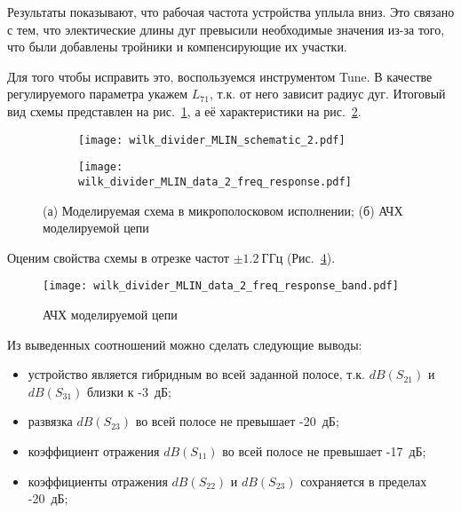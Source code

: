 Результаты показывают, что рабочая частота устройства уплыла вниз.
Это связано с тем, что электические длины дуг превысили необходимые значения из-за того, что были добавлены тройники и компенсирующие их участки.

Для того чтобы исправить это, воспользуемся инструментом Tune.
В качестве регулируемого параметра укажем $L_{71}$, т.к. от него зависит радиус дуг.
Итоговый вид схемы представлен на рис.~\ref{fig:wilk_divider_MLIN_schematic_2}, а её характеристики на рис.~\ref{fig:wilk_divider_MLIN_data_2_freq_response}.

\begin{figure}[!ht]
    \begin{subfigure}[!ht]{0.45\textwidth}
        \centering
        \texttt{[image: wilk\_divider\_MLIN\_schematic\_2.pdf]}
        \caption{}%
        \label{fig:wilk_divider_MLIN_schematic_2}
    \end{subfigure}
    \hfill
    \begin{subfigure}[!ht]{0.45\textwidth}
        \centering
        \texttt{[image: wilk\_divider\_MLIN\_data\_2\_freq\_response.pdf]}
        \caption{}%
        \label{fig:wilk_divider_MLIN_data_2_freq_response}
    \end{subfigure}
    \caption{%
        (а) Моделируемая схема в микрополосковом исполнении;
        (б) АЧХ моделируемой цепи
    }%
    \label{fig:wilk_divider_MLIN_tuned}
\end{figure}

Оценим свойства схемы в отрезке частот $\pm 1.2~\text{ГГц}$ (Рис.~\ref{fig:wilk_divider_MLIN_data_2_freq_response_band}).

\begin{figure}[!ht]
    \centering
    \texttt{[image: wilk\_divider\_MLIN\_data\_2\_freq\_response\_band.pdf]}
    \caption{АЧХ моделируемой цепи}%
    \label{fig:wilk_divider_MLIN_data_2_freq_response_band}
\end{figure}

Из выведенных соотношений можно сделать следующие выводы:
\begin{itemize}
    \item устройство является гибридным во всей заданной полосе, т.к. $dB(S_{21})$ и $dB(S_{31})$ близки к -3~дБ;
    \item развязка $dB(S_{23})$ во всей полосе не превышает -20~дБ;
    \item коэффициент отражения $dB(S_{11})$ во всей полосе не превышает -17~дБ;
    \item коэффициенты отражения $dB(S_{22})$ и $dB(S_{23})$ сохраняется в пределах -20~дБ;
\end{itemize}

